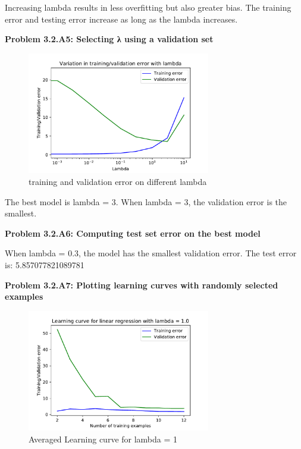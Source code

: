 \documentclass[]{book}
\theoremstyle{definition}
\begin{document}
\begin{flushleft}
	Increasing lambda results in less overfitting but also greater bias. The training error and testing error increase as long as the lambda increases.
\end{flushleft}
\textbf{Problem 3.2.A5: Selecting λ using a validation set}
\begin{figure}[H]
	\centering
	\includegraphics[width=8cm]{fig10to11.pdf}
	\caption{training and validation error on different lambda}
	\label{fig:12}
\end{figure}
\begin{flushleft}
	The best model is lambda = 3. When lambda = 3, the validation error is the smallest. 
\end{flushleft}
\textbf{Problem 3.2.A6: Computing test set error on the best model}
\begin{flushleft}
	When lambda = 0.3, the model has the smallest validation error. The test error is: 5.857077821089781
\end{flushleft}
\textbf{Problem 3.2.A7: Plotting learning curves with randomly selected examples}
\begin{figure}[H]
	\centering
	\includegraphics[width=8cm]{fig11.pdf}
	\caption{Averaged Learning curve for lambda = 1}
	\label{fig:13}
\end{figure}
\end{document}
